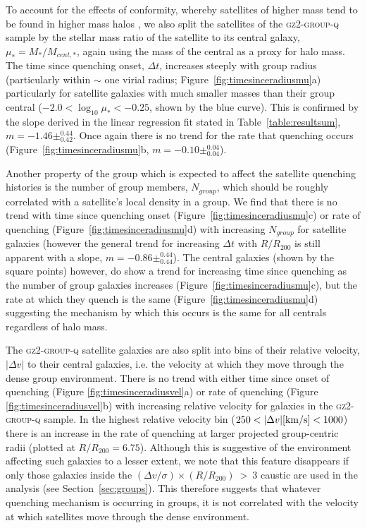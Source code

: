 \documentclass[useAMS,usenatbib]{mn2e}
\begin{document}
To account for the effects of conformity, whereby satellites of higher mass tend to be found in higher mass halos \citep{weinmann06, kauffmann13, hearin15, hatfield16}, we also split the satellites of the \textsc{gz2-group-q} sample by the stellar mass ratio of the satellite to its central galaxy, $\mu_* = M_*/M_{cent,*}$, again using the mass of the central as a proxy for halo mass. The time since quenching onset, $\Delta t $, increases steeply with group radius (particularly within $\sim$ one virial radius; Figure~\ref{fig:timesinceradiusmu}a) particularly for satellite galaxies with much smaller masses than their group central ($-2.0 < \log_{10}\mu_* < -0.25$, shown by the blue curve). This is confirmed by the slope derived in the linear regression fit stated in Table~\ref{table:resultsum}, $m=-1.46\pm_{0.42}^{0.44}$. Once again there is no trend for the rate that quenching occurs (Figure~\ref{fig:timesinceradiusmu}b, $m=-0.10\pm_{0.04}^{0.04}$). 


Another property of the group which is expected to affect the satellite quenching histories is the number of group members, $N_{group}$, which should be roughly correlated with a satellite's local density in a  group. We find that there is no trend with time since quenching onset (Figure~\ref{fig:timesinceradiusmu}c) or rate of quenching (Figure~\ref{fig:timesinceradiusmu}d) with increasing $N_{group}$ for satellite galaxies (however the general trend for increasing $\Delta t$ with $R/R_{200}$ is still apparent with a slope, $m=-0.86\pm_{0.44}^{0.44}$). The central galaxies (shown by the square points) however, do show a trend for increasing time since quenching as the number of group galaxies increases (Figure~\ref{fig:timesinceradiusmu}c), but the rate at which they quench is the same (Figure~\ref{fig:timesinceradiusmu}d) suggesting the mechanism by which this occurs is the same for all centrals regardless of halo mass. 

The \textsc{gz2-group-q} satellite galaxies are also split into bins of their relative velocity, $|\Delta v|$ to their central galaxies, i.e. the velocity at which they move through the dense group environment. There is no trend with either time since onset of quenching (Figure \ref{fig:timesinceradiusvel}a) or rate of quenching (Figure \ref{fig:timesinceradiusvel}b) with increasing relative velocity for galaxies in the \textsc{gz2-group-q} sample. In the highest relative velocity bin ($250 < |\Delta v| [\rm{km/s}] < 1000$) there is an increase in  the rate of quenching at larger projected group-centric radii (plotted at $R/R_{200}=6.75$). Although this is suggestive of the environment affecting such galaxies to a lesser extent, we  note that this feature disappears if only those galaxies inside the $(\Delta v/\sigma)\times(R/R_{200})~>~3$ caustic are used in the analysis (see Section~\ref{sec:groups}). This therefore suggests that whatever quenching mechanism is occurring in groups, it is not correlated with the velocity at which satellites move through the dense environment.
\end{document}
